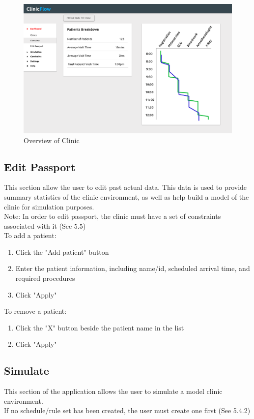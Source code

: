 \documentclass[12pt]{article}
\begin{document}
\begin{figure}[H]
\centering
\includegraphics[width=\textwidth]{overview}
\caption{Overview of Clinic}
\end{figure}

\subsection{Edit Passport}
This section allow the user to edit past actual data. This data is used to provide summary statistics of the clinic environment, as well as help build a model of the clinic for simulation purposes. \\ \newline
Note: In order to edit passport, the clinic must have a set of constraints associated with it (See 5.5) \\
To add a patient:
\begin{enumerate}
\item Click the "Add patient" button
\item Enter the patient information, including name/id, scheduled arrival time, and required procedures
\item Click "Apply"
\end{enumerate}

To remove a patient:
\begin{enumerate}
\item Click the "X" button beside the patient name in the list
\item Click "Apply"
\end{enumerate}
\subsection{Simulate}
This section of the application allows the user to simulate a model clinic environment. \\
If no schedule/rule set has been created, the user must create one first (See 5.4.2) \\
\end{document}
